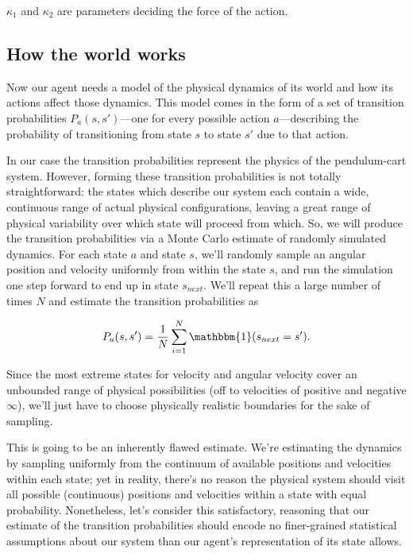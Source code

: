 \documentclass[12pt]{article}
\begin{document}
$\kappa_1$ and $\kappa_2$ are parameters deciding the force of the action.

\subsection{How the world works}

Now our agent needs a model of the physical dynamics of its world and how its actions affect those dynamics. This model comes in the form of a set of transition probabilities $P_a(s, s')$---one for every possible action $a$---describing the probability of transitioning from state $s$ to state $s'$ due to that action.

In our case the transition probabilities represent the physics of the pendulum-cart system. However, forming these transition probabilities is not totally straightforward: the states which describe our system each contain a wide, continuous range of actual physical configurations, leaving a great range of physical variability over which state will proceed from which. So, we will produce the transition probabilities via a Monte Carlo estimate of randomly simulated dynamics. For each state $a$ and state $s$, we'll randomly sample an angular position and velocity uniformly from within the state $s$, and run the simulation one step forward to end up in state $s_{next}$. We'll repeat this a large number of times $N$ and estimate the transition probabilities as

\begin{equation}
P_a(s, s') = \frac{1}{N}\sum_{i = 1}^N \mathbbm{1}(s_{next} = s').
\end{equation}

Since the most extreme states for velocity and angular velocity cover an unbounded range of physical possibilities (off to velocities of positive and negative $\infty$), we'll just have to choose physically realistic boundaries for the sake of sampling.

This is going to be an inherently flawed estimate. We're estimating the dynamics by sampling uniformly from the continuum of available positions and velocities within each state; yet in reality, there's no reason the physical system should visit all possible (continuous) positions and velocities within a state with equal probability. Nonetheless, let's consider this satisfactory, reasoning that our estimate of the transition probabilities should encode no finer-grained statistical assumptions about our system than our agent's representation of its state allows.\footnotemark
\end{document}

